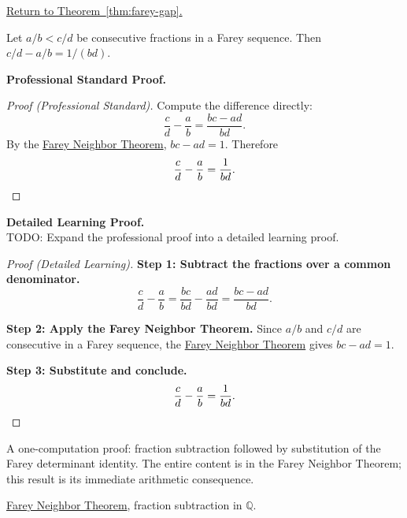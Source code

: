 
\newpage
{}
\label{prf:farey-gap}

\begin{remark*}[Return]
\hyperref[thm:farey-gap]{Return to Theorem~\ref*{thm:farey-gap}.}
\end{remark*}

\begin{theorem*}
Let $a/b < c/d$ be consecutive fractions in a Farey sequence.
Then $c/d - a/b = 1/(bd)$.
\end{theorem*}

\textbf{Professional Standard Proof.}~\\
\begin{proof}
[Proof (Professional Standard)]
Compute the difference directly:
\[
\frac{c}{d} - \frac{a}{b}
= \frac{bc - ad}{bd}.
\]
By the \hyperref[thm:farey-neighbor-theorem]{Farey Neighbor Theorem},
$bc - ad = 1$.  Therefore
\[
\frac{c}{d} - \frac{a}{b} = \frac{1}{bd}.
\qedhere
\]
\end{proof}

\textbf{Detailed Learning Proof.}~\\
TODO: Expand the professional proof into a detailed learning proof.


\begin{proof}[Proof (Detailed Learning)]
\textbf{Step 1: Subtract the fractions over a common denominator.}
\[
\frac{c}{d} - \frac{a}{b}
= \frac{bc}{bd} - \frac{ad}{bd}
= \frac{bc - ad}{bd}.
\]

\textbf{Step 2: Apply the Farey Neighbor Theorem.}
Since $a/b$ and $c/d$ are consecutive in a Farey sequence, the
\hyperref[thm:farey-neighbor-theorem]{Farey Neighbor Theorem}
gives $bc - ad = 1$.

\textbf{Step 3: Substitute and conclude.}
\[
\frac{c}{d} - \frac{a}{b} = \frac{1}{bd}.
\qedhere
\]
\end{proof}

\begin{remark*}
A one-computation proof: fraction subtraction followed by substitution
of the Farey determinant identity.  The entire content is in the Farey
Neighbor Theorem; this result is its immediate arithmetic consequence.
\end{remark*}

\begin{dependencies}
\hyperref[thm:farey-neighbor-theorem]{Farey Neighbor Theorem},
fraction subtraction in $\mathbb{Q}$.
\end{dependencies}
